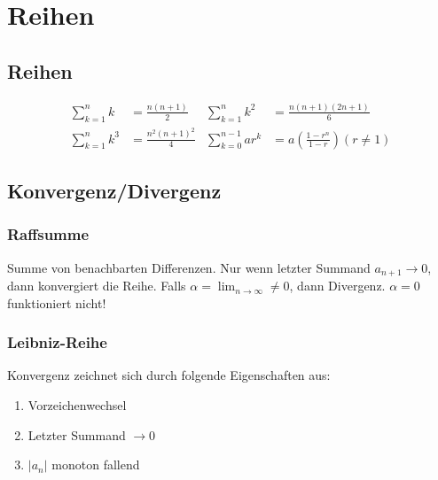 \section{Reihen}

\subsection{Reihen }
\begin{align*}
	\sum_{k=1}^n k   &= \frac{n(n+1)}{2} &
	\sum_{k=1}^n k^2 &= \frac{n(n+1)(2n+1)}{6} \\
	\sum_{k=1}^n k^3 &= \frac{n^2(n+1)^2}{4} &
	\sum_{k=0}^{n-1} ar^k &= a\left(\frac{1-r^n}{1-r}\right) (r \neq 1)
\end{align*}


\subsection{Konvergenz/Divergenz}
\subsubsection{Raffsumme}
Summe von benachbarten Differenzen. Nur wenn letzter Summand $a_{n+1} \rightarrow 0$, dann konvergiert die Reihe.
Falls $\alpha = \lim_{n \rightarrow \infty} \neq 0$, dann Divergenz. $\alpha=0$ funktioniert nicht!

\subsubsection{Leibniz-Reihe}
Konvergenz zeichnet sich durch folgende Eigenschaften aus:
\begin{enumerate}[nosep]
	\item Vorzeichenwechsel
	\item Letzter Summand $\rightarrow 0$
	\item $\left|a_n\right|$ monoton fallend
\end{enumerate}

